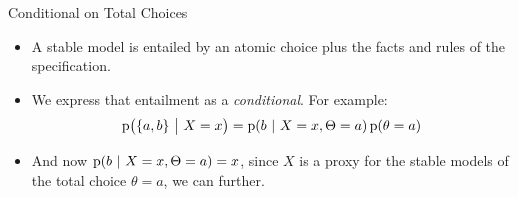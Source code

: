\documentclass{beamer}
\newcommand{\at}[1]{\ensuremath{\!\del{#1}}}
\newcommand{\pr}[1]{\ensuremath{\mathrm{p}\at{#1}}}
\newcommand{\given}{\ensuremath{~\middle|~}}
\begin{document}
\begin{frame}{Conditional on Total Choices}    
    \begin{itemize}
        \item A stable model is entailed by an atomic choice plus the facts and rules of the specification.
        \item We express that entailment as a \textit{conditional}. For example:
        $$\pr{\set{a,b} \given X = x} = \pr{b \given X = x, \Theta = a}\pr{\theta = a}$$ 
        \item And now $\pr{b \given X = x, \Theta = a} = x$, since $X$ is a proxy for the stable models of the total choice $\theta = a$, we can further.
    \end{itemize}
\end{frame}
\end{document}
